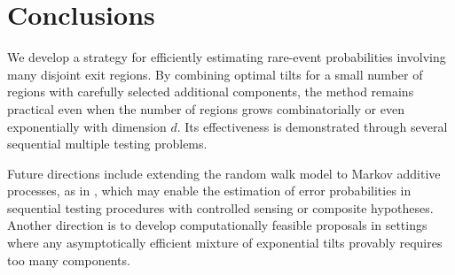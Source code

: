 \documentclass[aap,preprint]{imsart}
\theoremstyle{plain}
\theoremstyle{definition}
\begin{document}
\section{Conclusions}\label{sec:conclusion}
We develop a strategy for efficiently estimating rare-event probabilities involving many disjoint exit regions. By combining optimal tilts for a small number of regions with carefully selected additional components, the method remains practical even when the number of regions grows combinatorially or even exponentially with dimension $d$. Its effectiveness is demonstrated through several sequential multiple testing problems.

Future directions include extending the random walk model to Markov additive processes, as in \cite{collamore2002}, which may enable the estimation of error probabilities in sequential testing procedures with controlled sensing or composite hypotheses. Another direction is to develop computationally feasible proposals in settings where any asymptotically efficient mixture of exponential tilts provably requires too many components.



\end{document}
